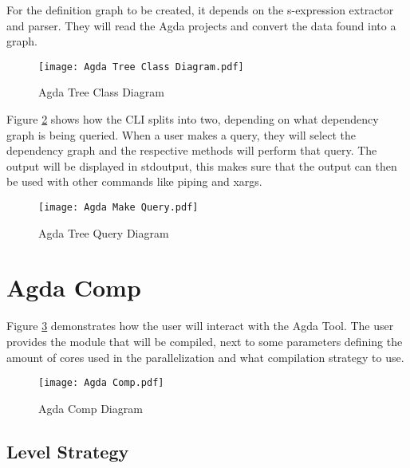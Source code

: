 For the definition graph to be created, it depends on the s-expression
extractor and parser. They will read the Agda projects and convert the data
found into a graph.

\begin{figure}[H]
    \centering
    \texttt{[image: Agda Tree Class Diagram.pdf]}
    \caption{Agda Tree Class Diagram}
    \label{fig:Agda Tree Class Diagram}
\end{figure} 
    
\pagebreak

Figure \ref{fig:Agda Tree Query Diagram} shows how the CLI splits into two,
depending on what dependency graph is being queried. When a user makes a query,
they will select the dependency graph and the respective methods will perform
that query. The output will be displayed in stdoutput, this makes sure that the
output can then be used with other commands like piping and xargs.

\begin{figure}[H]
    \centering
    \texttt{[image: Agda Make Query.pdf]}
    \caption{Agda Tree Query Diagram}
    \label{fig:Agda Tree Query Diagram}
\end{figure} 

\pagebreak 


\section{Agda Comp}


Figure \ref{fig:Agda Comp Diagram} demonstrates how the user will interact with
the Agda Tool. The user provides the module that will be compiled, next to some
parameters defining the amount of cores used in the parallelization and what
compilation strategy to use.
\begin{figure}[H]
    \centering 
    \texttt{[image: Agda Comp.pdf]}
    \caption{Agda Comp Diagram}
    \label{fig:Agda Comp Diagram}
\end{figure} 

\pagebreak
\subsection{Level Strategy} \label{sub:design level strategy}

